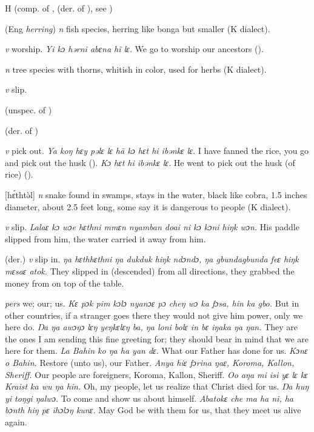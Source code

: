 \begin{letter}{H}
 (comp. of ,  (der. of ), see ) 

 (Eng \textit{herring}) \textit{n} fish species, herring like bonga but smaller (K dialect).

 \textit{v} worship. \textit{ Yi kɔ hərni abɛna hĩ lɛ.} We go to worship our ancestors (\citealt{Pichl1967}).

 \textit{n} tree species with thorns, whitish in color, used for herbs (K dialect).

 \textit{v} slip.

 (unspec. of ) 

 (der. of ) 

 \textit{v} pick out. \textit{Ya koŋ hɛy pəlɛ lɛ hã kɔ hɛt hi ibənkɛ lɛ.} I have fanned the rice, you go and pick out the husk (\citealt{Pichl1967}). \textit{Kɔ hɛt hi ibənkɛ lɛ.} He went to pick out the husk (of rice) (\citealt{Pichl1967}).

 [hɛ́thtǝ̀l] \textit{n} snake found in swamps, stays in the water, black like cobra, 1.5 inches diameter, about 2.5 feet long, some say it is dangerous to people (K dialect). 

 \textit{v} slip. \textit{Lalaɛ kɔ wɔe hɛthni mmɛn nyamban doai ni kɔ kɔni hiŋk wɔn.} His paddle slipped from him, the water carried it away from him.

 (der.) \textit{v} slip in. \textit{ŋa hɛthhɛthni ŋa dukduk hiŋk ndɔndɔ, ŋa gbundagbunda feɛ hiŋk mɛsaɛ atok.} They slipped in (descended) from all directions, they grabbed the money from on top of the table.

 \textit{pers} we; our; us. \textit{Kɛ pɔk pim kɔlɔ nyanɔɛ pɔ cheŋ wɔ ka fɔsa, hin ka gbo.} But in other countries, if a stranger goes there they would not give him power, only we here do. \textit{Ŋa ŋa awɔŋɔ lɛŋ yeŋkɛlɛŋ ba, ŋa loni bolɛ in bɛ iŋaka ŋa ŋan.} They are the ones I am sending this fine greeting for; they should bear in mind that we are here for them. \textit{La Bahin ko ŋa ha yan dɛ.} What our Father has done for us. \textit{Kɔnɛ o Bahin.} Restore (unto us), our Father. \textit{Anya hiɛ fɔrina ŋaɛ, Koroma, Kallon, Sheriff.} Our people are foreigners, Koroma, Kallon, Sheriff. \textit{Oo aŋa mi isi yɛ lɛ kɛ Kraist ka wu ŋa hin.} Oh, my people, let us realize that Christ died for us. \textit{Ŋa huŋ yi toŋgi ŋalwɔ.} To come and show us about himself. \textit{Abatokɛ che ma ha ni, ha bɔnth hiŋ pɛ ihɔlɔŋ kunɛ.} May God be with them for us, that they meet us alive again.


\end{letter}

